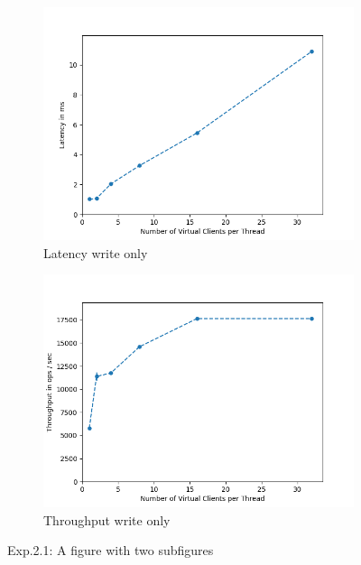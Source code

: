 \documentclass[11pt,a4paper]{article}
\begin{document}
\begin{figure}[H]
\centering
\begin{subfigure}{.5\textwidth}
    \centering
    \includegraphics[width=\textwidth]{img/exp2_1/exp2_1_latency_write_1.png}
    \caption{Latency write only}
    \label{fig:mesh1}
\end{subfigure}%
\begin{subfigure}{.5\textwidth}
      \centering
    \includegraphics[width=\textwidth]{img/exp2_1/exp2_1_throughput_write_1.png}
    \caption{Throughput write only}
    \label{fig:mesh1}
\end{subfigure}
\caption{Exp.2.1: A figure with two subfigures}
\label{fig:test}
\end{figure}
\end{document}
